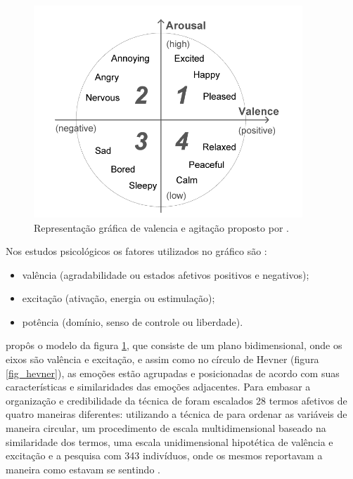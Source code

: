 \documentclass[
	12pt,				%
	openright,			%
	oneside,
	a4paper,			%
	english,			%
	french,				%
	spanish,			%
	brazil				%
	]{abntex2}
\begin{document}
\begin{figure}[H]
        \advance{}\textwidth
        \caption{\label{fig_dim} Representação gráfica de valencia e agitação proposto por .}
        \includegraphics[width=0.9\textwidth]{russell.png}
\end{figure}

Nos estudos psicológicos os fatores utilizados no gráfico são \cite{osgood1957measurement} \cite{plutchik1980emotion}: 
\begin{itemize}
        \item 
            valência (agradabilidade ou estados afetivos positivos e negativos);
        \item 
            excitação (ativação, energia ou estimulação);
        \item 
            potência (domínio, senso de controle ou liberdade).
\end{itemize}

 propôs o modelo da figura \ref{fig_dim}, que consiste de um plano bidimensional, onde os eixos são valência e excitação, e assim como no círculo de Hevner (figura \ref{fig_hevner}), as emoções estão agrupadas e posicionadas de acordo com suas características e similaridades das emoções adjacentes.
Para embasar a organização e credibilidade da técnica de  foram escalados 28 termos afetivos de quatro maneiras diferentes: utilizando a técnica de  para ordenar as variáveis de maneira circular, um procedimento de escala multidimensional baseado na similaridade dos termos, uma escala unidimensional hipotética de valência e excitação e a pesquisa com 343 indivíduos, onde os mesmos reportavam a maneira como estavam se sentindo \cite{russell1980circumplex}.
\end{document}
